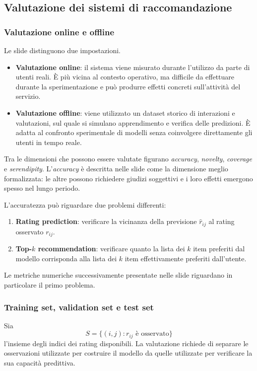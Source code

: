 \subsection{Valutazione dei sistemi di raccomandazione}

\subsubsection{Valutazione online e offline}
Le slide distinguono due impostazioni.
\begin{itemize}
    \item \textbf{Valutazione online}: il sistema viene misurato durante l'utilizzo da parte di utenti reali. È più vicina al contesto operativo, ma difficile da effettuare durante la sperimentazione e può produrre effetti concreti sull'attività del servizio.
    \item \textbf{Valutazione offline}: viene utilizzato un dataset storico di interazioni e valutazioni, sul quale si simulano apprendimento e verifica delle predizioni. È adatta al confronto sperimentale di modelli senza coinvolgere direttamente gli utenti in tempo reale.
\end{itemize}
Tra le dimensioni che possono essere valutate figurano \emph{accuracy}, \emph{novelty}, \emph{coverage} e \emph{serendipity}. L'\emph{accuracy} è descritta nelle slide come la dimensione meglio formalizzata: le altre possono richiedere giudizi soggettivi e i loro effetti emergono spesso nel lungo periodo.

L'accuratezza può riguardare due problemi differenti:
\begin{enumerate}
    \item \textbf{Rating prediction}: verificare la vicinanza della previsione $\hat r_{ij}$ al rating osservato $r_{ij}$.
    \item \textbf{Top-$k$ recommendation}: verificare quanto la lista dei $k$ item preferiti dal modello corrisponda alla lista dei $k$ item effettivamente preferiti dall'utente.
\end{enumerate}
Le metriche numeriche successivamente presentate nelle slide riguardano in particolare il primo problema.

\subsubsection{Training set, validation set e test set}
Sia
\[
S=\{(i,j):r_{ij}\text{ è osservato}\}
\]
l'insieme degli indici dei rating disponibili. La valutazione richiede di separare le osservazioni utilizzate per costruire il modello da quelle utilizzate per verificare la sua capacità predittiva.

